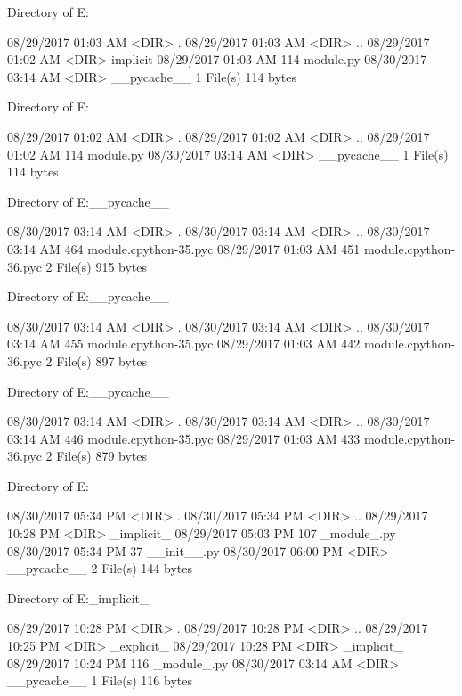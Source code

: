  Directory of E:\Python\apeman\mockup\implicit\implicit

08/29/2017  01:03 AM    <DIR>          .
08/29/2017  01:03 AM    <DIR>          ..
08/29/2017  01:02 AM    <DIR>          implicit
08/29/2017  01:03 AM               114 module.py
08/30/2017  03:14 AM    <DIR>          __pycache__
               1 File(s)            114 bytes

 Directory of E:\Python\apeman\mockup\implicit\implicit\implicit

08/29/2017  01:02 AM    <DIR>          .
08/29/2017  01:02 AM    <DIR>          ..
08/29/2017  01:02 AM               114 module.py
08/30/2017  03:14 AM    <DIR>          __pycache__
               1 File(s)            114 bytes

 Directory of E:\Python\apeman\mockup\implicit\implicit\implicit\__pycache__

08/30/2017  03:14 AM    <DIR>          .
08/30/2017  03:14 AM    <DIR>          ..
08/30/2017  03:14 AM               464 module.cpython-35.pyc
08/29/2017  01:03 AM               451 module.cpython-36.pyc
               2 File(s)            915 bytes

 Directory of E:\Python\apeman\mockup\implicit\implicit\__pycache__

08/30/2017  03:14 AM    <DIR>          .
08/30/2017  03:14 AM    <DIR>          ..
08/30/2017  03:14 AM               455 module.cpython-35.pyc
08/29/2017  01:03 AM               442 module.cpython-36.pyc
               2 File(s)            897 bytes

 Directory of E:\Python\apeman\mockup\implicit\__pycache__

08/30/2017  03:14 AM    <DIR>          .
08/30/2017  03:14 AM    <DIR>          ..
08/30/2017  03:14 AM               446 module.cpython-35.pyc
08/29/2017  01:03 AM               433 module.cpython-36.pyc
               2 File(s)            879 bytes

 Directory of E:\Python\apeman\mockup\implicitImport

08/30/2017  05:34 PM    <DIR>          .
08/30/2017  05:34 PM    <DIR>          ..
08/29/2017  10:28 PM    <DIR>          _implicit_
08/29/2017  05:03 PM               107 _module_.py
08/30/2017  05:34 PM                37 __init__.py
08/30/2017  06:00 PM    <DIR>          __pycache__
               2 File(s)            144 bytes

 Directory of E:\Python\apeman\mockup\implicitImport\_implicit_

08/29/2017  10:28 PM    <DIR>          .
08/29/2017  10:28 PM    <DIR>          ..
08/29/2017  10:25 PM    <DIR>          _explicit_
08/29/2017  10:28 PM    <DIR>          _implicit_
08/29/2017  10:24 PM               116 _module_.py
08/30/2017  03:14 AM    <DIR>          __pycache__
               1 File(s)            116 bytes


